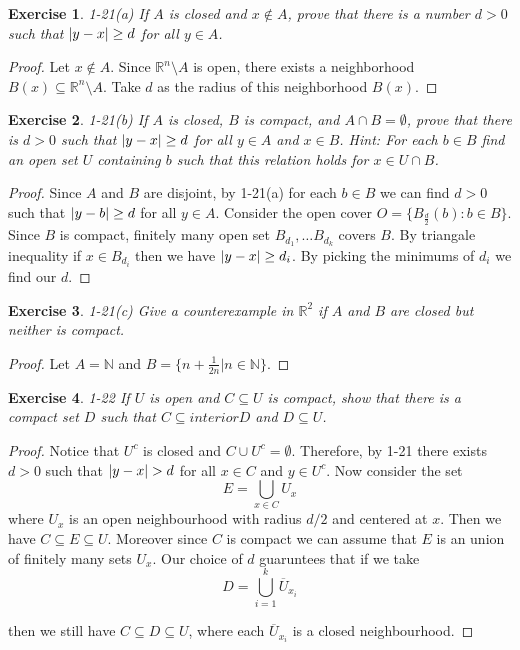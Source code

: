 \documentclass[12pt]{book}
\newtheorem*{exercise*}{Exercise}
\newcommand{\interior}{interior}
\begin{document}
\begin{exercise*}
1-21(a) If $A$ is closed and $x \not\in A$, prove that there is a number $d > 0$ such that $\abs{y-x} \ge d$ for all $y \in A$. 
\end{exercise*}

\begin{proof}
  Let $x \not\in A$. Since $\mathbb{R}^n \setminus A$ is open, there exists a neighborhood $B(x) \subseteq \mathbb{R}^n \setminus A$. Take $d$ as the radius of this neighborhood $B(x)$. 
\end{proof}

\begin{exercise*}
  1-21(b) If $A$ is closed, $B$ is compact, and $A \cap B = \emptyset$, prove that there is $d > 0$ such that $\abs{y-x} \ge d$ for all $y \in A$ and $x \in B$. Hint: For each $b \in B$ find an open set $U$ containing $b$ such that this relation holds for $x \in U \cap B$. 
\end{exercise*}

\begin{proof}
  Since $A$ and $B$ are disjoint, by 1-21(a) for each $b\in B$ we can find $d > 0$ such that $\abs{y -b } \ge d$ for all $y \in A$. Consider the open cover $O = \{B_{\frac{d}{2}}(b) : b \in B\}$. Since $B$ is compact, finitely many open set $B_{d_1}, \ldots B_{d_k}$ covers $B$. By triangale inequality if $x \in B_{d_i}$ then we have $\abs{y -x } \ge d_i$. By picking the minimums of $d_i$ we find our $d$. 
\end{proof}

\begin{exercise*}
  1-21(c) Give a counterexample in $\mathbb{R}^2$ if $A$ and $B$ are closed but neither is compact. 
\end{exercise*}

\begin{proof}
  Let $A = \mathbb{N}$ and $B = \{n + \frac{1}{2n} | n \in \mathbb{N} \}$. 
\end{proof}

\begin{exercise*}
  1-22 If $U$ is open and $C \subseteq U$ is compact, show that there is a
  compact set $D$ such that $C \subseteq \interior D$ and $D \subseteq U$. 
\end{exercise*}

\begin{proof}
  Notice that $U^c$ is closed and $C \cup U^c = \emptyset$. Therefore, by 1-21 there exists $d> 0$ such that $\abs{y -x } > d$ for all $x \in C$ and $y \in U^c$. Now consider the set
  \[
  E = \bigcup_{x \in C} U_x
  \]
  where $U_x$ is an open neighbourhood with radius $d/2$ and centered at $x$. Then we have $C \subseteq E \subseteq U$. Moreover since $C$ is compact we can assume that $E$ is an union of finitely many sets $U_x$. Our choice of $d$ guaruntees that if we take
  \[
  D = \bigcup_{i=1}^k\overline{U}_{x_i}
  \] 

then we still have $C \subseteq D \subseteq U$, where each $\overline{U}_{x_i}$
is a closed neighbourhood.
\end{proof}
\end{document}
